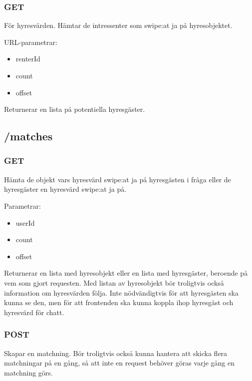 \documentclass{article}
\begin{document}
\subsubsection {GET}
\label{ssub:GET}

För hyresvärden. Hämtar de intressenter som swipe:at ja på hyresobjektet.

URL-parametrar:

\begin{itemize}
    \item renterId
    \item count
    \item offset
\end{itemize}

Returnerar en lista på potentiella hyresgäster.

\subsection {/matches}
\label{sub:/matches}

\subsubsection {GET}
\label{ssub:GET}

Hämta de objekt vars hyresvärd swipe:at ja på hyresgästen i fråga eller de hyresgäster en hyresvärd swipe:at ja på.

Parametrar:

\begin{itemize}
    \item userId 
    \item count
    \item offset
\end{itemize}

Returnerar en lista med hyresobjekt eller en lista med hyresgäster, beroende på vem som gjort requesten. Med listan av hyresobjekt bör troligtvis också
information om hyresvärden följa. Inte nödvändigtvis för att hyresgästen ska kunna se den, men för att frontenden ska kunna koppla ihop hyresgäst och
hyresvärd för chatt.

\subsubsection {POST}
\label{ssub:POST}

Skapar en matchning. Bör troligtvis också kunna hantera att skicka flera matchningar på en gång, så att inte en request behöver göras varje gång en
matchning görs.
\end{document}
